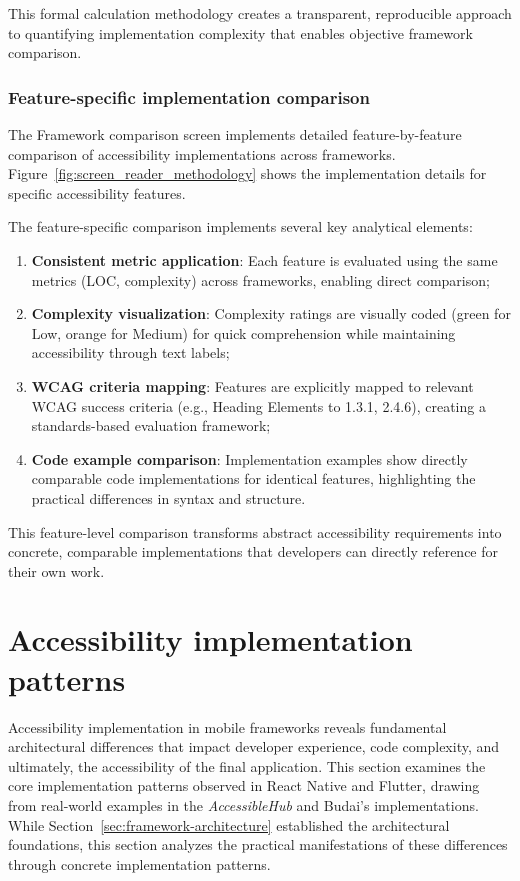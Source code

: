 This formal calculation methodology creates a transparent, reproducible approach to quantifying implementation complexity that enables objective framework comparison.

\subsubsection{Feature-specific implementation comparison}

The Framework comparison screen implements detailed feature-by-feature comparison of accessibility implementations across frameworks. Figure~\ref{fig:screen_reader_methodology} shows the implementation details for specific accessibility features.

The feature-specific comparison implements several key analytical elements:

\begin{enumerate}
    \item \textbf{Consistent metric application}: Each feature is evaluated using the same metrics (LOC, complexity) across frameworks, enabling direct comparison;
    
    \item \textbf{Complexity visualization}: Complexity ratings are visually coded (green for Low, orange for Medium) for quick comprehension while maintaining accessibility through text labels;
    
    \item \textbf{WCAG criteria mapping}: Features are explicitly mapped to relevant WCAG success criteria (e.g., Heading Elements to 1.3.1, 2.4.6), creating a standards-based evaluation framework;
    
    \item \textbf{Code example comparison}: Implementation examples show directly comparable code implementations for identical features, highlighting the practical differences in syntax and structure.
\end{enumerate}

This feature-level comparison transforms abstract accessibility requirements into concrete, comparable implementations that developers can directly reference for their own work.

\section{Accessibility implementation patterns}
\label{subsec:implementation-patterns}

Accessibility implementation in mobile frameworks reveals fundamental architectural differences that impact developer experience, code complexity, and ultimately, the accessibility of the final application. This section examines the core implementation patterns observed in React Native and Flutter, drawing from real-world examples in the \textit{AccessibleHub} and Budai's implementations. While Section~\ref{sec:framework-architecture} established the architectural foundations, this section analyzes the practical manifestations of these differences through concrete implementation patterns.

